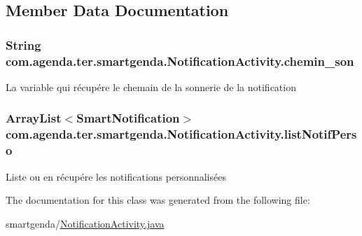 \subsection{Member Data Documentation}
\hypertarget{classcom_1_1agenda_1_1ter_1_1smartgenda_1_1_notification_activity_ae6a52fd850ecd253b963340e2fa03912}{
\subsubsection[{chemin\-\_\-son}]{\setlength{\rightskip}{0pt plus 5cm}String com.\-agenda.\-ter.\-smartgenda.\-Notification\-Activity.\-chemin\-\_\-son\hspace{0.3cm}{\ttfamily [static]}}}\label{classcom_1_1agenda_1_1ter_1_1smartgenda_1_1_notification_activity_ae6a52fd850ecd253b963340e2fa03912}
La variable qui récupére le chemain de la sonnerie de la notification \hypertarget{classcom_1_1agenda_1_1ter_1_1smartgenda_1_1_notification_activity_af02388bb3c735063760d16584d84765f}{
\subsubsection[{list\-Notif\-Perso}]{\setlength{\rightskip}{0pt plus 5cm}Array\-List$<${\bf Smart\-Notification}$>$ com.\-agenda.\-ter.\-smartgenda.\-Notification\-Activity.\-list\-Notif\-Perso\hspace{0.3cm}{\ttfamily [static]}}}\label{classcom_1_1agenda_1_1ter_1_1smartgenda_1_1_notification_activity_af02388bb3c735063760d16584d84765f}
Liste ou en récupére les notifications personnalisées 

The documentation for this class was generated from the following file\-:\begin{DoxyCompactItemize}
\item 
smartgenda/\hyperlink{_notification_activity_8java}{Notification\-Activity.\-java}\end{DoxyCompactItemize}
